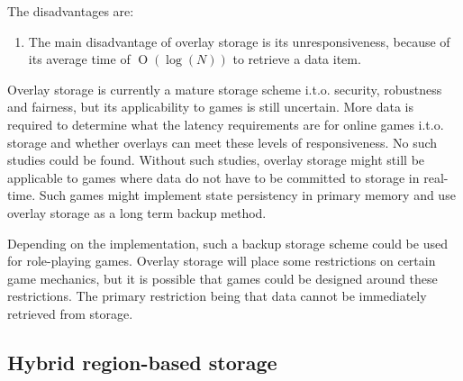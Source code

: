 \documentclass[10pt,a4paper,journal,cspaper,compsoc]{IEEEtran}
\providecommand{\OO}[1]{\operatorname{O}\left(#1\right)}
\begin{document}
The disadvantages are:
%
\begin{enumerate}
    \item The main disadvantage of overlay storage is its unresponsiveness, because of its average time of $\OO{\log(N)}$ to retrieve a data
        item.
\end{enumerate}

Overlay storage is currently a mature storage scheme i.t.o. security, robustness and fairness, but its applicability to games is still uncertain.
More data is required to determine what the latency requirements are for online games i.t.o. storage and whether overlays can meet these levels of
responsiveness. No such studies could be found. Without such studies, overlay storage might still be applicable to games where data do not have to be
committed to storage in real-time. Such games might implement state persistency in primary memory and use overlay storage as a long term backup
method.

Depending on the implementation, such a backup storage scheme could be used for role-playing games. Overlay storage will place some restrictions on
certain game mechanics, but it is possible that games could be designed around these restrictions. The primary restriction being that data cannot be
immediately retrieved from storage.

\subsection{Hybrid region-based storage}
\label{hybrid_storage}
\end{document}
